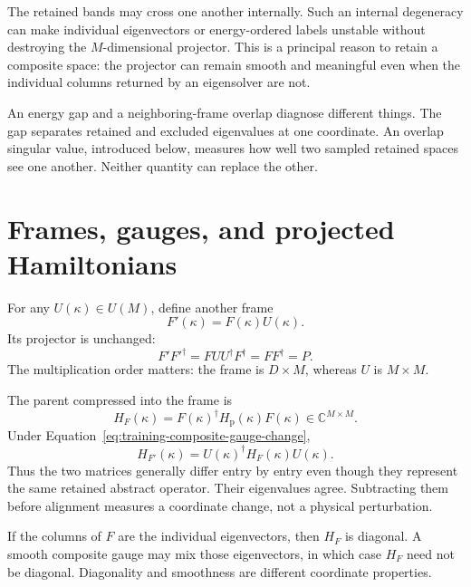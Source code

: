 The retained bands may cross one another internally. Such an internal
degeneracy can make individual eigenvectors or energy-ordered labels unstable
without destroying the $M$-dimensional projector. This is a principal reason to
retain a composite space: the projector can remain smooth and meaningful even
when the individual columns returned by an eigensolver are not.

An energy gap and a neighboring-frame overlap diagnose different things. The
gap separates retained and excluded eigenvalues at one coordinate. An overlap
singular value, introduced below, measures how well two sampled retained spaces
see one another. Neither quantity can replace the other.

\section{Frames, gauges, and projected Hamiltonians}

For any $U(\kappa)\in U(M)$, define another frame
\begin{equation}
  F'(\kappa)=F(\kappa)U(\kappa).
  \label{eq:training-composite-gauge-change}
\end{equation}
Its projector is unchanged:
\begin{equation}
  F'F'^{\dagger}=FUU^{\dagger}F^{\dagger}=FF^{\dagger}=P.
  \label{eq:training-composite-projector-invariance}
\end{equation}
The multiplication order matters: the frame is $D\times M$, whereas $U$ is
$M\times M$.

The parent compressed into the frame is
\begin{equation}
  H_F(\kappa)
  =F(\kappa)^{\dagger}H_{\mathrm p}(\kappa)F(\kappa)
  \in\mathbb C^{M\times M}.
  \label{eq:training-composite-projected-operator}
\end{equation}
Under Equation~\eqref{eq:training-composite-gauge-change},
\begin{equation}
  H_{F'}(\kappa)
  =U(\kappa)^{\dagger}H_F(\kappa)U(\kappa).
  \label{eq:training-composite-operator-covariance}
\end{equation}
Thus the two matrices generally differ entry by entry even though they represent
the same retained abstract operator. Their eigenvalues agree. Subtracting them
before alignment measures a coordinate change, not a physical perturbation.

If the columns of $F$ are the individual eigenvectors, then $H_F$ is diagonal.
A smooth composite gauge may mix those eigenvectors, in which case $H_F$ need
not be diagonal. Diagonality and smoothness are different coordinate
properties.

